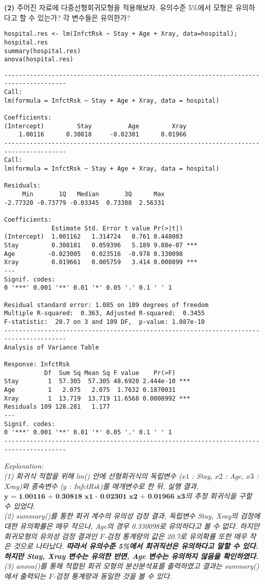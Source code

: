 \documentclass{article}
\begin{document}
\textbf{(2)} 주어진 자료에 다중선형회귀모형을 적용해보자. 유의수준 5\%에서 모형은 유의하다고 할
수 있는가? 각 변수들은 유의한가?

\begin{lstlisting}[style={r-style}]
hospital.res <- lm(InfctRsk ~ Stay + Age + Xray, data=hospital); hospital.res
summary(hospital.res)
anova(hospital.res)
\end{lstlisting}
\begin{lstlisting}[style={out-style}]
---------------------------------------------------------------------------------------
Call:
lm(formula = InfctRsk ~ Stay + Age + Xray, data = hospital)

Coefficients:
(Intercept)         Stay          Age         Xray  
    1.00116      0.30818     -0.02301      0.01966  
---------------------------------------------------------------------------------------
Call:
lm(formula = InfctRsk ~ Stay + Age + Xray, data = hospital)

Residuals:
     Min       1Q   Median       3Q      Max 
-2.77320 -0.73779 -0.03345  0.73308  2.56331 

Coefficients:
             Estimate Std. Error t value Pr(>|t|)    
(Intercept)  1.001162   1.314724   0.761 0.448003    
Stay         0.308181   0.059396   5.189 9.88e-07 ***
Age         -0.023005   0.023516  -0.978 0.330098    
Xray         0.019661   0.005759   3.414 0.000899 ***
---
Signif. codes:  
0 '***' 0.001 '**' 0.01 '*' 0.05 '.' 0.1 ' ' 1

Residual standard error: 1.085 on 109 degrees of freedom
Multiple R-squared:  0.363,	Adjusted R-squared:  0.3455 
F-statistic:  20.7 on 3 and 109 DF,  p-value: 1.087e-10
---------------------------------------------------------------------------------------
Analysis of Variance Table

Response: InfctRsk
           Df  Sum Sq Mean Sq F value    Pr(>F)    
Stay        1  57.305  57.305 48.6920 2.444e-10 ***
Age         1   2.075   2.075  1.7632 0.1870031    
Xray        1  13.719  13.719 11.6568 0.0008992 ***
Residuals 109 128.281   1.177                      
---
Signif. codes:  
0 '***' 0.001 '**' 0.01 '*' 0.05 '.' 0.1 ' ' 1
---------------------------------------------------------------------------------------
\end{lstlisting}
\emph{Explanation: \\
(1) 회귀식 적합을 위해 lm() 안에 선형회귀식의 독립변수 ($x1$ : Stay, $x2$ : Age, $x3$ : Xray)와 종속변수 ($y$ : InfctRsk)를 매개변수로 한 뒤, 실행 결과, $\textbf{y = 1.00116 + 0.30818 x1 - 0.02301 x2 + 0.01966 x3}$의 추정 회귀식을 구할 수 있었다. \\
(2) summary()를 통한 회귀 계수의 유의성 검정 결과, 독립변수 Stay, Xray의 검정에 대한 유의확률은 매우 작으나, Age의 경우 0.330098로 유의하다고 볼 수 없다. 하지만 회귀모형의 유의성 검정 결과인 $F$-검정 통계량의 값은
20.7로 유의확률 또한 매우 작은 것으로 나타났다. \textbf{따라서 유의수준 5\%에서 회귀직선은 유의하다고 말할 수 있다. 하지만 Stay, Xray 변수는 유의한 반면, Age 변수는 유의하지 않음을 확인하였다.}  \\
(3) anova()를 통해 적합된 회귀 모형의 분산분석표를 출력하였고 결과는 summary()에서 출력되는 $F$-검정 통계량과 동일한 것을 볼 수 있다.} \\
\end{document}
